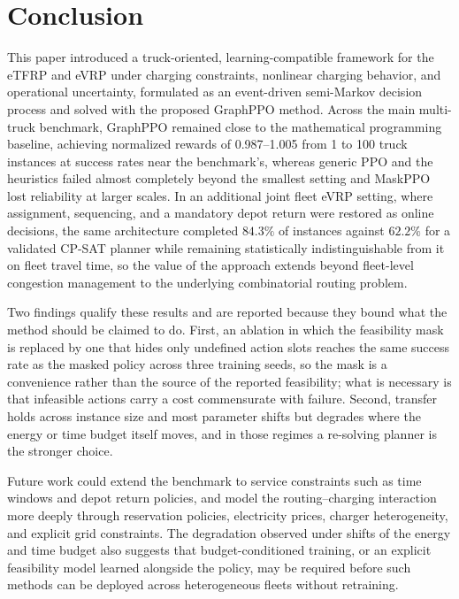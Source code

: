 \documentclass[journal]{IEEEtran}
\begin{document}
\section{Conclusion}

This paper introduced a truck-oriented, learning-compatible framework for the eTFRP and eVRP under charging constraints, nonlinear charging behavior, and operational uncertainty, formulated as an event-driven semi-Markov decision process and solved with the proposed GraphPPO method.  Across the main multi-truck benchmark, GraphPPO remained close to the mathematical programming baseline, achieving normalized rewards of 0.987--1.005 from 1 to 100 truck instances at success rates near the benchmark's, whereas generic PPO and the heuristics failed almost completely beyond the smallest setting and MaskPPO lost reliability at larger scales. In an additional joint fleet eVRP setting, where assignment, sequencing, and a mandatory depot return were restored as online decisions, the same architecture completed $84.3\%$ of instances against $62.2\%$ for a validated CP-SAT planner while remaining statistically indistinguishable from it on fleet travel time, so the value of the approach extends beyond fleet-level congestion management to the underlying combinatorial routing problem.

Two findings qualify these results and are reported because they bound what the method should be claimed to do. First, an ablation in which the feasibility mask is replaced by one that hides only undefined action slots reaches the same success rate as the masked policy across three training seeds, so the mask is a convenience rather than the source of the reported feasibility; what is necessary is that infeasible actions carry a cost commensurate with failure. Second, transfer holds across instance size and most parameter shifts but degrades where the energy or time budget itself moves, and in those regimes a re-solving planner is the stronger choice.

Future work could extend the benchmark to service constraints such as time windows and depot return policies, and model the routing--charging interaction more deeply through reservation policies, electricity prices, charger heterogeneity, and explicit grid constraints. The degradation observed under shifts of the energy and time budget also suggests that budget-conditioned training, or an explicit feasibility model learned alongside the policy, may be required before such methods can be deployed across heterogeneous fleets without retraining. 
\end{document}
